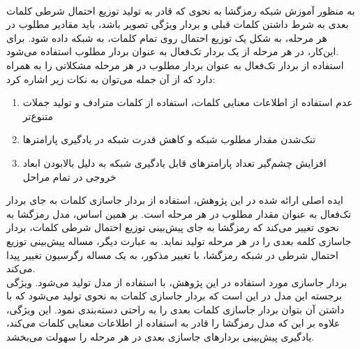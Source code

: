 \\
به منظور آموزش شبکه رمزگشا به نحوی که قادر به تولید توزیع احتمال شرطی کلمات بعدی به شرط داشتن کلمات قبلی و بردار ویژگی تصویر باشد، باید مقادیر مطلوب در هر مرحله، به شکل یک توزیع احتمال روی تمام کلمات، به شبکه داده شود. برای این‌کار، در هر مرحله از یک بردار تک‌فعال به عنوان بردار مطلوب استفاده می‌‌شود. 
\\
استفاده از بردار تک‌فعال به عنوان بردار مطلوب در هر مرحله مشکلاتی را به همراه دارد که از آن‌ جمله می‌توان به نکات زیر اشاره کرد:
\begin{enumerate}
	\item عدم استفاده از اطلاعات معنایی کلمات، استفاده از کلمات مترادف و تولید جملات متنوع‌تر
	\item تنک‌شدن مقدار مطلوب شبکه و کاهش قدرت شبکه در یادگیری پارامترها
	\item افزایش چشم‌گیر تعداد پارامترهای قابل یادگیری شبکه به دلیل بالابودن ابعاد خروجی در تمام مراحل
\end{enumerate}
ایده اصلی ارائه شده در این پژوهش، استفاده از بردار جاسازی کلمات به جای بردار تک‌فعال به عنوان مقدار مطلوب در هر مرحله است. بر همین اساس، مدل رمزگشا به نحوی تغییر می‌کند که رمزگشا به جای پیش‌بینی توزیع احتمال شرطی کلمات، بردار جاسازی کلمه بعدی را در هر مرحله تولید نماید. به عبارت دیگر، مساله پیش‌بینی توزیع احتمال شرطی در شبکه رمزگشا، با تغییر مذکور، به یک مساله رگرسیون تغییر پیدا می‌کند.
\\
بردار جاسازی مورد استفاده در این پژوهش، با استفاده از مدل  تولید می‌شود. ویژگی برجسته این مدل در این است که بردار جاسازی کلمات به نحوی تولید می‌شود که با داشتن آن بتوان بردار جاسازی کلمات بعدی را به راحتی دسته‌بندی نمود. این ویژگی، علاوه بر این که مدل رمزگشا را قادر به استفاده از اطلاعات معنایی کلمات می‌کند، یادگیری پیش‌بینی بردارهای جاسازی بعدی در هر مرحله را سهولت می‌بخشد.
\\

